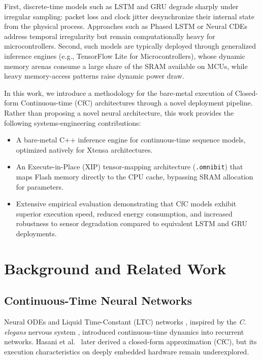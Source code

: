 \documentclass[conference]{IEEEtran}
\begin{document}
First, discrete-time models such as LSTM and GRU degrade sharply under irregular sampling: packet loss and clock jitter desynchronize their internal state from the physical process. Approaches such as Phased LSTM \cite{neil2016phased} or Neural CDEs \cite{kidger2020ncde} address temporal irregularity but remain computationally heavy for microcontrollers. Second, such models are typically deployed through generalized inference engines (e.g., TensorFlow Lite for Microcontrollers), whose dynamic memory arenas consume a large share of the SRAM available on MCUs, while heavy memory-access patterns raise dynamic power draw.

In this work, we introduce a methodology for the bare-metal execution of Closed-form Continuous-time (CfC) architectures \cite{hasani2022cfc} through a novel deployment pipeline. Rather than proposing a novel neural architecture, this work provides the following systems-engineering contributions:
\begin{itemize}
\item A bare-metal C++ inference engine for continuous-time sequence models, optimized natively for Xtensa architectures.
\item An Execute-in-Place (XIP) tensor-mapping architecture (\texttt{.omnibit}) that maps Flash memory directly to the CPU cache, bypassing SRAM allocation for parameters.
\item Extensive empirical evaluation demonstrating that CfC models exhibit superior execution speed, reduced energy consumption, and increased robustness to sensor degradation compared to equivalent LSTM and GRU deployments.
\end{itemize}

\section{Background and Related Work}
\subsection{Continuous-Time Neural Networks}
Neural ODEs \cite{chen2018node,rubanova2019latent} and Liquid Time-Constant (LTC) networks \cite{hasani2021ltc}, inspired by the \textit{C. elegans} nervous system \cite{lechner2020ncp}, introduced continuous-time dynamics into recurrent networks. Hasani et al.\ \cite{hasani2022cfc} later derived a closed-form approximation (CfC), but its execution characteristics on deeply embedded hardware remain underexplored.
\end{document}

